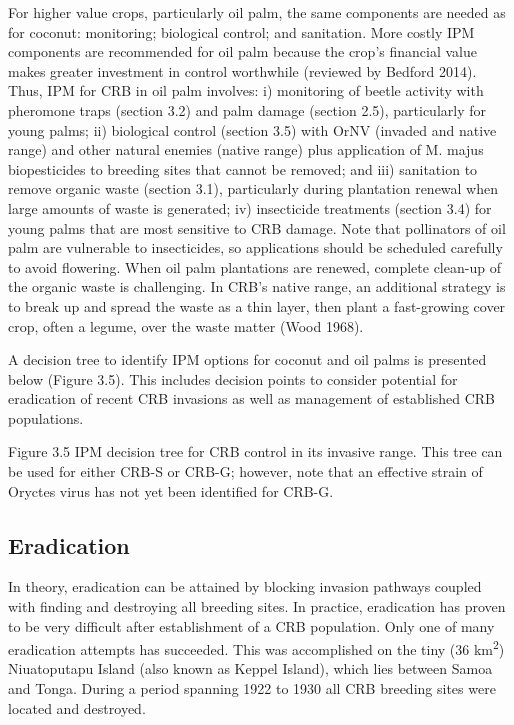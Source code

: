 \documentclass[twocolumn,letterpaper]{scrartcl}
\begin{document}
For higher value crops, particularly oil palm, the same components are needed as for coconut: monitoring; 
biological control; and sanitation. More costly IPM components are recommended for oil palm because the 
crop’s financial value makes greater investment in control worthwhile (reviewed by Bedford 2014). Thus, IPM for 
CRB in oil palm involves: i) monitoring of beetle activity with pheromone traps (section 3.2) and palm damage 
(section 2.5), particularly for young palms; ii) biological control (section 3.5) with OrNV (invaded and native 
range) and other natural enemies (native range) plus application of M. majus biopesticides to breeding sites 
that cannot be removed; and iii) sanitation to remove organic waste (section 3.1), particularly during plantation 
renewal when large amounts of waste is generated; iv) insecticide treatments (section 3.4) for young palms that 
are most sensitive to CRB damage. Note that pollinators of oil palm are vulnerable to insecticides, so applications 
should be scheduled carefully to avoid flowering. When oil palm plantations are renewed, complete clean-up 
of the organic waste is challenging. In CRB’s native range, an additional strategy is to break up and spread the 
waste as a thin layer, then plant a fast-growing cover crop, often a legume, over the waste matter (Wood 1968). 

A decision tree to identify IPM options for coconut and oil palms is presented below (Figure 3.5). This includes 
decision  points  to  consider  potential  for  eradication  of  recent  CRB  invasions  as  well  as  management  of 
established CRB populations. 

Figure 3.5   IPM decision tree for CRB control in its invasive range. This tree can be used for either CRB-S  
or CRB-G; however, note that an effective strain of Oryctes virus has not yet been identified for CRB-G. 

\subsection{Eradication}

In theory, eradication can be attained by blocking invasion pathways coupled with finding and destroying all breeding sites. In practice, eradication has proven to be very difficult after establishment of a CRB population. Only one of many eradication attempts has succeeded. This was accomplished on the tiny (36 km\textsuperscript{2}) Niuatoputapu Island (also known as Keppel Island), which lies between Samoa and Tonga. During a period spanning 1922 to 1930 all CRB breeding sites were located and destroyed.
\end{document}
